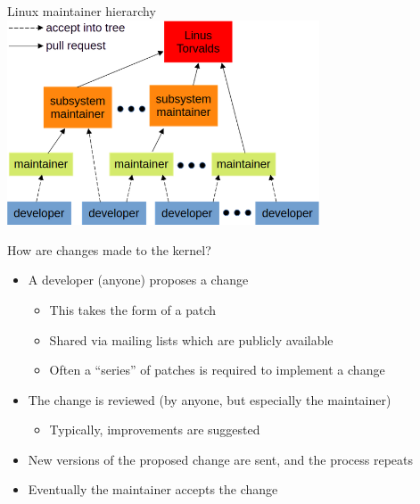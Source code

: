 \documentclass[aspectratio=169, notes]{beamer}
\begin{document}
\begin{frame}{Linux maintainer hierarchy}
	\includegraphics[width=25em]{maintainer_hierarchy.png}
\end{frame}

\begin{frame}{How are changes made to the kernel?}
	\begin{itemize}
	\item A developer (anyone) proposes a change
		\begin{itemize}
		\item This takes the form of a patch
		\item Shared via  mailing lists which are publicly available
		\item Often a ``series'' of patches is required to implement a change
		\end{itemize}
	\item The change is reviewed (by anyone, but especially the maintainer)
		\begin{itemize}
		\item Typically, improvements are suggested
		\end{itemize}
	\item New versions of the proposed change are sent, and the process repeats
	\item Eventually the maintainer accepts the change
	\end{itemize}
\end{frame}
\end{document}
